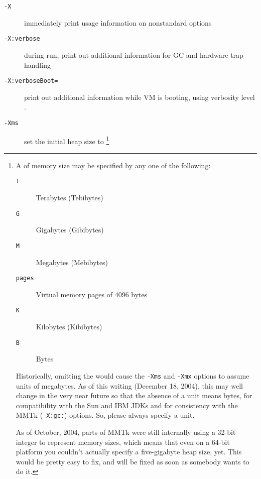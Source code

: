 \begin{description}
\item[{\tt -X}]
immediately print usage information on nonstandard options

\item[{\tt -X:verbose}]
during run, print out additional information for GC and hardware trap handling

\item[{\tt -X:verboseBoot=}]
print out additional information while VM is booting, using verbosity
level .

\item[{\tt -Xms}]
set the initial heap size to %
  \footnote{A  of memory size may be specified by any
      one of the following: 
      \begin{description}
      \item[\texttt{T}] Terabytes (Tebibytes)
      \item[\texttt{G}] Gigabytes (Gibibytes)
      \item[\texttt{M}] Megabytes (Mebibytes)
      \item[\texttt{pages}] Virtual memory pages of 4096 bytes
      \item[\texttt{K}] Kilobytes (Kibibytes)
      \item[\texttt{B}] Bytes
      \end{description}

      Historically, omitting the  would cause the \texttt{-Xms}
      and \texttt{-Xmx} options to assume units of megabytes.  As of this
      writing (December 18, 2004), this may well change in the very near
      future so that the absence of a unit means bytes, for compatibility
      with the Sun and IBM JDKs and for consistency with the MMTk
      (\texttt{-X:gc:}) options.  So, please always specify a unit.

      As of October, 2004, parts of MMTk were still internally using a
      32-bit integer to represent memory sizes, which means that even on a
      64-bit platform you couldn't actually specify a five-gigabyte heap size,
      yet.  This would be pretty easy to fix, and will be fixed as soon as
      somebody wants to do it.

}
\end{description}
